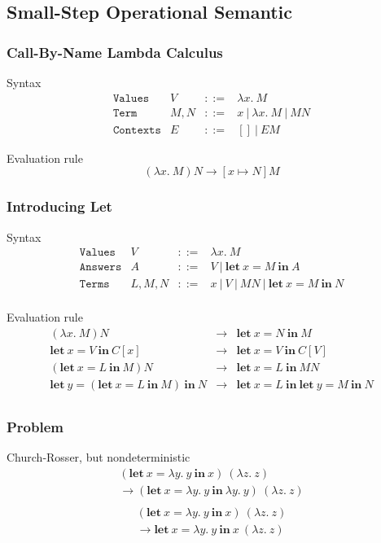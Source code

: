 \documentclass[dvipdfmx,cjk,xcolor=dvipsnames,envcountsect,notheorems,12pt]{beamer}
\theoremstyle{definition}
\newcommand{\keyword}[1]{\mathbf{#1}}
\newcommand{\LET}{\keyword{let}}
\newcommand{\IN}{\keyword{in}}
\begin{document}
\subsection{Small-Step Operational Semantic}

\begin{frame}
	\frametitle{Call-By-Name Lambda Calculus}
	\Large
	Syntax
	{\large \[\begin{array}{llcl}
		\texttt{Values} & V & ::= & \lambda x.~M \\
		\texttt{Term} & M, N & ::= & x~|~\lambda x.~M~|~MN\\
		\texttt{Contexts} & E & ::= & []~|~EM
	\end{array}\]}

	\vfill

	Evaluation rule
	{\large \[(\lambda x.~M) N\longrightarrow [x\mapsto N]M\]}
\end{frame}

\begin{frame}
	\frametitle{Introducing Let}
	\Large
	Syntax
	{\normalsize \[\begin{array}{llcl}
		\texttt{Values} & V & ::= & \lambda x.~M \\
		\texttt{Answers} & A & ::= & V~|~\LET~x=M~\IN~A \\
		\texttt{Terms} & L, M, N & ::= & x~|~V~|~MN~|~\LET~x=M~\IN~N\\
	\end{array}\]}

	Evaluation rule
	{\small \[\begin{array}{lcl}
		(\lambda x.~M) N & \longrightarrow & \LET~x=N~\IN~M \\
		\LET~x=V~\IN~C[x] & \longrightarrow & \LET~x=V~\IN~C[V] \\
		(\LET~x=L~\IN~M)N & \longrightarrow & \LET~x=L~\IN~MN \\
		\LET~y=(\LET~x=L~\IN~M)~\IN~N & \longrightarrow & \LET~x=L~\IN~\LET~y=M~\IN~N \\
	\end{array}\]}
\end{frame}

\begin{frame}
	\frametitle{Problem}
	\Large
	Church-Rosser, but nondeterministic
	{\large \[\begin{array}{c}
		(\LET~x=\lambda y.~y~\IN~x)~(\lambda z.~z) \\
		\longrightarrow (\LET~x=\lambda y.~y~\IN~\lambda y.~y)~(\lambda z.~z) \\
	\end{array}\]
	\[\begin{array}{c}
		(\LET~x=\lambda y.~y~\IN~x)~(\lambda z.~z) \\
		\longrightarrow \LET~x=\lambda y.~y~\IN~x~(\lambda z.~z)
	\end{array}\]}
\end{frame}
\end{document}
